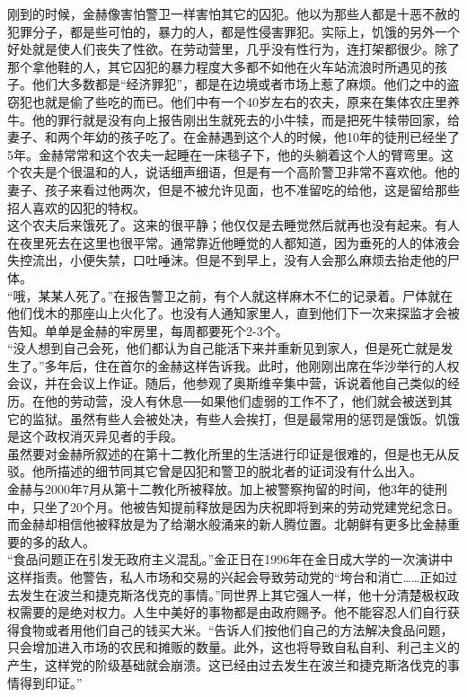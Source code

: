 刚到的时候，金赫像害怕警卫一样害怕其它的囚犯。他以为那些人都是十恶不赦的犯罪分子，都是些可怕的，暴力的人，都是性侵害罪犯。实际上，饥饿的另外一个好处就是使人们丧失了性欲。在劳动营里，几乎没有性行为，连打架都很少。除了那个拿他鞋的人，其它囚犯的暴力程度大多都不如他在火车站流浪时所遇见的孩子。他们大多数都是“经济罪犯”，都是在边境或者市场上惹了麻烦。他们之中的盗窃犯也就是偷了些吃的而已。他们中有一个40岁左右的农夫，原来在集体农庄里养牛。他的罪行就是没有向上报告刚出生就死去的小牛犊，而是把死牛犊带回家，给妻子、和两个年幼的孩子吃了。在金赫遇到这个人的时候，他10年的徒刑已经坐了5年。金赫常常和这个农夫一起睡在一床毯子下，他的头躺着这个人的臂弯里。这个农夫是个很温和的人，说话细声细语，但是有一个高阶警卫非常不喜欢他。他的妻子、孩子来看过他两次，但是不被允许见面，也不准留吃的给他，这是留给那些招人喜欢的囚犯的特权。\\

这个农夫后来饿死了。这来的很平静；他仅仅是去睡觉然后就再也没有起来。有人在夜里死去在这里也很平常。通常靠近他睡觉的人都知道，因为垂死的人的体液会失控流出，小便失禁，口吐唾沫。但是不到早上，没有人会那么麻烦去抬走他的尸体。\\

“哦，某某人死了。”在报告警卫之前，有个人就这样麻木不仁的记录着。尸体就在他们伐木的那座山上火化了。也没有人通知家里人，直到他们下一次来探监才会被告知。单单是金赫的牢房里，每周都要死个2-3个。\\

“没人想到自己会死，他们都认为自己能活下来并重新见到家人，但是死亡就是发生了。”多年后，住在首尔的金赫这样告诉我。此时，他刚刚出席在华沙举行的人权会议，并在会议上作证。随后，他参观了奥斯维辛集中营，诉说着他自己类似的经历。在他的劳动营，没人有休息──如果他们虚弱的工作不了，他们就会被送到其它的监狱。虽然有些人会被处决，有些人会挨打，但是最常用的惩罚是饿饭。饥饿是这个政权消灭异见者的手段。\\

虽然要对金赫所叙述的在第十二教化所里的生活进行印证是很难的，但是也无从反驳。他所描述的细节同其它曾是囚犯和警卫的脱北者的证词没有什么出入。\\

金赫与2000年7月从第十二教化所被释放。加上被警察拘留的时间，他3年的徒刑中，只坐了20个月。他被告知提前释放是因为庆祝即将到来的劳动党建党纪念日。而金赫却相信他被释放是为了给潮水般涌来的新人腾位置。北朝鲜有更多比金赫重要的多的敌人。\\

“食品问题正在引发无政府主义混乱。”金正日在1996年在金日成大学的一次演讲中这样指责。他警告，私人市场和交易的兴起会导致劳动党的“垮台和消亡……正如过去发生在波兰和捷克斯洛伐克的事情。”同世界上其它强人一样，他十分清楚极权政权需要的是绝对权力。人生中美好的事物都是由政府赐予。他不能容忍人们自行获得食物或者用他们自己的钱买大米。“告诉人们按他们自己的方法解决食品问题，只会增加进入市场的农民和摊贩的数量。此外，这也将导致自私自利、利己主义的产生，这样党的阶级基础就会崩溃。这已经由过去发生在波兰和捷克斯洛伐克的事情得到印证。”\\

